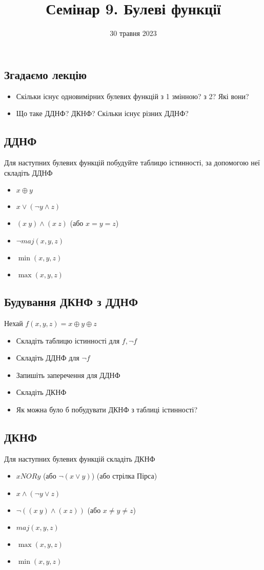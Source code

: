 \documentclass{article}
\begin{document}
\title{Семінар 9. Булеві функції}
\date{30 травня 2023}

\maketitle

\subsection*{Згадаємо лекцію}
\begin{itemize}
    \item Скільки існує одновимірних булевих функцій з 1 змінною? з 2? Які вони?
    \item Що таке ДДНФ? ДКНФ? Скільки існує різних ДДНФ?
\end{itemize}

\subsection*{ДДНФ}
Для наступних булевих функцій побудуйте таблицю істинності, за допомогою неї складіть ДДНФ
\begin{itemize}
    \item $x \oplus y$
    \item $x \lor (\lnot y \land z)$
    \item $(x~y) \land (x~z)$ (або $x=y=z$)
    \item $\lnot maj(x,y,z)$
    \item $\min(x,y,z)$
    \item $\max(x,y,z)$
\end{itemize}

\subsection*{Будування ДКНФ з ДДНФ}
Нехай $f(x,y,z) = x \oplus y \oplus z$
\begin{itemize}
    \item Складіть таблицю істинності для $f, \lnot f$
    \item Складіть ДДНФ для $\lnot f$
    \item Запишіть заперечення для ДДНФ
    \item Складіть ДКНФ
    \item Як можна було б побудувати ДКНФ з таблиці істинності?
\end{itemize}

\subsection*{ДКНФ}
Для наступних булевих функцій складіть ДКНФ
\begin{itemize}
    \item $x NOR y$ (або $\lnot (x \lor y)$) (або стрілка Пірса)
    \item $x \land (\lnot y \lor z)$
    \item $\lnot((x~y) \land (x~z))$ (або $x \neq y \neq z$)
    \item $maj(x,y,z)$
    \item $\max(x,y,z)$
    \item $\min(x,y,z)$
\end{itemize}
\end{document}
